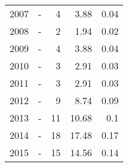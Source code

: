 \begin{longtable}{lXrrr}
        2007 & \multicolumn{1}{X}{-} & %
          \num{4} &
          \num[round-mode=places,round-precision=2]{3,88} &
          \num[round-mode=places,round-precision=2]{0,04} \\

        2008 & \multicolumn{1}{X}{-} & %
          \num{2} &
          \num[round-mode=places,round-precision=2]{1,94} &
          \num[round-mode=places,round-precision=2]{0,02} \\

        2009 & \multicolumn{1}{X}{-} & %
          \num{4} &
          \num[round-mode=places,round-precision=2]{3,88} &
          \num[round-mode=places,round-precision=2]{0,04} \\

        2010 & \multicolumn{1}{X}{-} & %
          \num{3} &
          \num[round-mode=places,round-precision=2]{2,91} &
          \num[round-mode=places,round-precision=2]{0,03} \\

        2011 & \multicolumn{1}{X}{-} & %
          \num{3} &
          \num[round-mode=places,round-precision=2]{2,91} &
          \num[round-mode=places,round-precision=2]{0,03} \\

        2012 & \multicolumn{1}{X}{-} & %
          \num{9} &
          \num[round-mode=places,round-precision=2]{8,74} &
          \num[round-mode=places,round-precision=2]{0,09} \\

        2013 & \multicolumn{1}{X}{-} & %
          \num{11} &
          \num[round-mode=places,round-precision=2]{10,68} &
          \num[round-mode=places,round-precision=2]{0,1} \\

        2014 & \multicolumn{1}{X}{-} & %
          \num{18} &
          \num[round-mode=places,round-precision=2]{17,48} &
          \num[round-mode=places,round-precision=2]{0,17} \\

        2015 & \multicolumn{1}{X}{-} & %
          \num{15} &
          \num[round-mode=places,round-precision=2]{14,56} &
          \num[round-mode=places,round-precision=2]{0,14} \\


\end{longtable}
